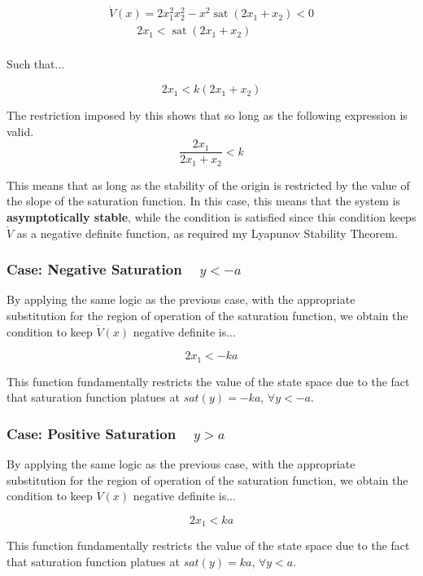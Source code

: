 $$
\begin{array}{l}
\dot{V}(x) = 2x_1^2x_2^2 -x^2 \operatorname{sat}(2x_1 + x_2) < 0 \\
\quad \quad\:\: 2x_1 < \operatorname{sat}(2x_1 + x_2) \\
\end{array}
$$

\noindent Such that...

$$2x_1 < k\left( 2x_1 + x_2 \right)$$

\noindent The restriction imposed by this shows that so long as the following expression is valid.
$$
\frac{2x_1}{2x_1 + x_2} < k
$$

\noindent This means that as long as the stability of the origin is restricted by the value of the slope of the saturation function. In this case, this means that the system is \textbf{asymptotically stable}, while the condition is satisfied since this condition keeps $\dot{V}$ as a negative definite function, as required my Lyapunov Stability Theorem.


\subsubsection*{Case: Negative Saturation ~ $ y < -a $}

\noindent By applying the same logic as the previous case, with the appropriate substitution for the region of operation of the saturation function, we obtain the condition to keep $\dot{V}(x)$ negative definite is...

$$
2x_1 < -ka
$$

\noindent This function fundamentally restricts the value of the state space due to the fact that saturation function platues at $sat(y) = -ka$, $\forall y < -a$.


\subsubsection*{Case: Positive Saturation  ~ $ y > a $}

\noindent By applying the same logic as the previous case, with the appropriate substitution for the region of operation of the saturation function, we obtain the condition to keep $\dot{V}(x)$ negative definite is...

$$
2x_1 < ka
$$

\noindent This function fundamentally restricts the value of the state space due to the fact that saturation function platues at $sat(y) = ka$, $\forall y < a$.



